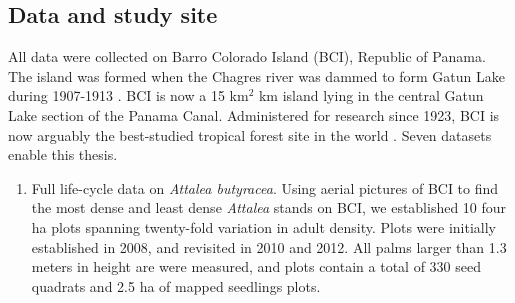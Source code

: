 \documentclass[b5paper,justified]{tufte-book} %
\begin{document}
\begin{fullwidth}
\section{Data and study site}
All data were collected on Barro Colorado Island (BCI), Republic of Panama.  The island was formed when the Chagres river was dammed to form Gatun Lake during 1907-1913 \citep{Enders1935}. BCI is now a 15 km$^2$ km island lying in the central Gatun Lake section of the Panama Canal. Administered for research since 1923,  BCI is now arguably the best-studied tropical forest site in the world \citep{Leigh1999}.  Seven datasets enable this thesis. 

\begin{enumerate}
\subsection{Model system} 
\item Full life-cycle data on \textit{Attalea butyracea}.  Using aerial pictures of BCI to find the most dense and least dense \textit{Attalea} stands on BCI, we established 10 four ha plots spanning twenty-fold variation in adult density. Plots were initially established in 2008, and revisited in 2010 and 2012. All palms larger than 1.3 meters in height are were measured, and plots contain a total of 330 seed quadrats and 2.5 ha of mapped seedlings plots.


\end{enumerate}
\end{fullwidth}
\end{document}
